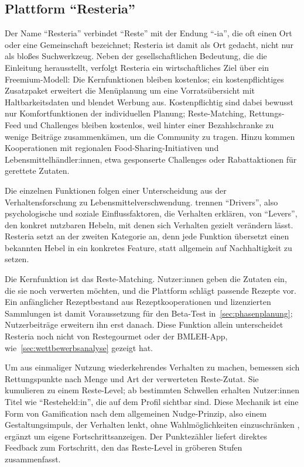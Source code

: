 \subsection{Plattform \enquote{Resteria}}\label{sec:konzept}

Der Name \enquote{Resteria} verbindet \enquote{Reste} mit der Endung \enquote{-ia}, die oft einen Ort oder eine Gemeinschaft bezeichnet; Resteria ist damit als Ort gedacht, nicht nur als bloßes Suchwerkzeug. Neben der gesellschaftlichen Bedeutung, die die Einleitung herausstellt, verfolgt Resteria ein wirtschaftliches Ziel über ein Freemium-Modell: Die Kernfunktionen bleiben kostenlos; ein kostenpflichtiges Zusatzpaket erweitert die Menüplanung um eine Vorratsübersicht mit Haltbarkeitsdaten und blendet Werbung aus. Kostenpflichtig sind dabei bewusst nur Komfortfunktionen der individuellen Planung; Reste-Matching, Rettungs-Feed und Challenges bleiben kostenlos, weil hinter einer Bezahlschranke zu wenige Beiträge zusammenkämen, um die Community zu tragen. Hinzu kommen Kooperationen mit regionalen Food-Sharing-Initiativen und Lebensmittelhändler:innen, etwa gesponserte Challenges oder Rabattaktionen für gerettete Zutaten.

Die einzelnen Funktionen folgen einer Unterscheidung aus der Verhaltensforschung zu Lebensmittelverschwendung. \textcite[S. 105]{vittuariHowReduceConsumer2023} trennen \enquote{Drivers}, also psychologische und soziale Einflussfaktoren, die Verhalten erklären, von \enquote{Levers}, den konkret nutzbaren Hebeln, mit denen sich Verhalten gezielt verändern lässt. Resteria setzt an der zweiten Kategorie an, denn jede Funktion übersetzt einen bekannten Hebel in ein konkretes Feature, statt allgemein auf Nachhaltigkeit zu setzen.

Die Kernfunktion ist das Reste-Matching. Nutzer:innen geben die Zutaten ein, die sie noch verwerten möchten, und die Plattform schlägt passende Rezepte vor. Ein anfänglicher Rezeptbestand aus Rezeptkooperationen und lizenzierten Sammlungen ist damit Voraussetzung für den Beta-Test in~\autoref{sec:phasenplanung}; Nutzerbeiträge erweitern ihn erst danach. Diese Funktion allein unterscheidet Resteria noch nicht von Restegourmet oder der \ac{BMLEH}-App, wie~\autoref{sec:wettbewerbsanalyse} gezeigt hat.

Um aus einmaliger Nutzung wiederkehrendes Verhalten zu machen, bemessen sich Rettungspunkte nach Menge und Art der verwerteten Reste-Zutat. Sie kumulieren zu einem Reste-Level; ab bestimmten Schwellen erhalten Nutzer:innen Titel wie \enquote{Resteheld:in}, die auf dem Profil sichtbar sind. Diese Mechanik ist eine Form von Gamification nach dem allgemeinen Nudge-Prinzip, also einem Gestaltungsimpuls, der Verhalten lenkt, ohne Wahlmöglichkeiten einzuschränken \parencite[S. 2]{barkerWhatNudgeTechniques2021}, ergänzt um eigene Fortschrittsanzeigen. Der Punktezähler liefert direktes Feedback zum Fortschritt, den das Reste-Level in gröberen Stufen zusammenfasst.

